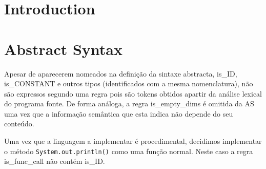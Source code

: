 \documentclass[a4paper]{article}
\title{\documentTitle}
\author{\documentAuthors{}}
\begin{document}
\renewcommand{\figurename}{Figure}
\maketitle
\cleardoublepage

\tableofcontents
\cleardoublepage

\setlength{\parindent}{1cm}
\setlength{\parskip}{0.3cm}

\section{Introduction}
\section{Abstract Syntax}
\indent \indent Apesar de aparecerem nomeados na definição da sintaxe abstracta, 
is\_ID, is\_CONSTANT e outros tipos (identificados com a mesma nomenclatura),
não são expressos segundo uma regra pois são tokens obtidos apartir da análise lexical do programa fonte.
De forma análoga, a regra is\_empty\_dims é omitida da AS uma vez que a informação semântica que esta indica não depende do seu conteúdo.

Uma vez que a linguagem a implementar é procedimental, decidimos implementar o método \texttt{System.out.println()} como uma função normal.
Neste caso a regra is_func_call não contém is_ID. 
\end{document}

